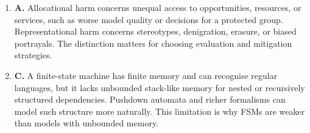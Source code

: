 \documentclass[11pt,a4paper]{article}
\begin{document}
\begin{enumerate}[leftmargin=*]
\begin{enumerate}
\item \textbf{A.} Allocational harm concerns unequal access to opportunities, resources, or services, such as worse model quality or decisions for a protected group. Representational harm concerns stereotypes, denigration, erasure, or biased portrayals. The distinction matters for choosing evaluation and mitigation strategies.
\item \textbf{C.} A finite-state machine has finite memory and can recognise regular languages, but it lacks unbounded stack-like memory for nested or recursively structured dependencies. Pushdown automata and richer formalisms can model such structure more naturally. This limitation is why FSMs are weaker than models with unbounded memory.
\end{enumerate}
\end{enumerate}
\end{document}
